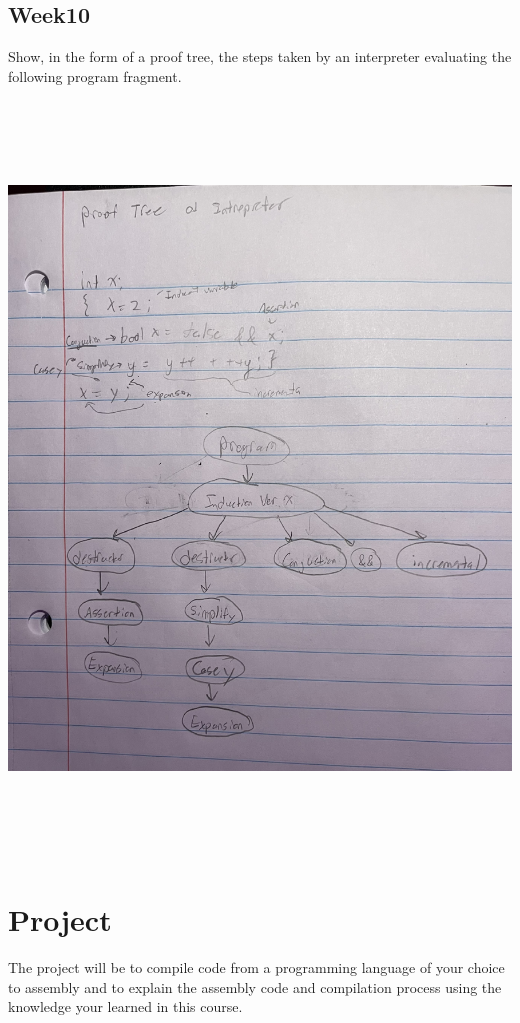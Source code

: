 \documentclass{article}
\theoremstyle{theorem}
\theoremstyle{definition}
\theoremstyle{remark}
\begin{document}
\subsection{Week10}
Show, in the form of a proof tree, the steps taken by an interpreter evaluating the following program fragment.
\medskip\begin{center}
\includegraphics[width=15cm, height=20cm]{Week10.pdf}
\end{center}
\clearpage

\section{Project}

The project will be to compile code from a programming language of your choice to assembly and to explain the assembly code and compilation process using the knowledge your learned in this course. 
\end{document}
